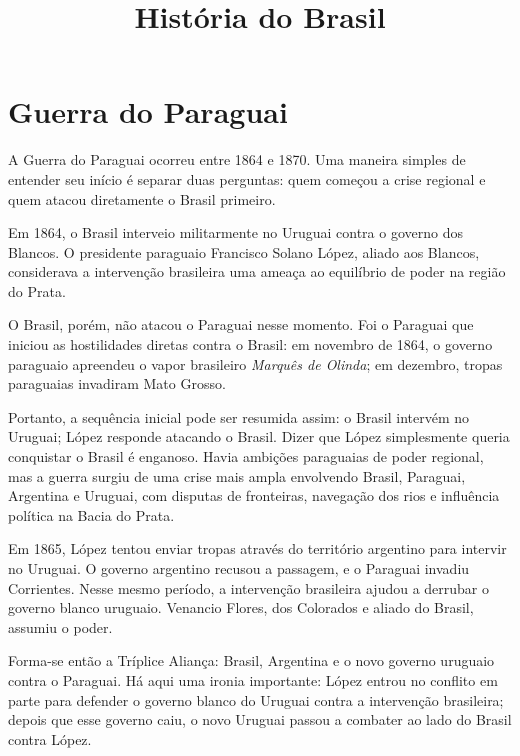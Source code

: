 



\title{História do Brasil}
\maketitle

\label{section-phantom}

\tableofcontents

\section{Guerra do Paraguai}
\label{section-guerra-do-paraguai}

A Guerra do Paraguai ocorreu entre 1864 e
1870. Uma maneira simples de entender seu
início é separar duas perguntas: quem começou
a crise regional e quem atacou diretamente o
Brasil primeiro.

Em 1864, o Brasil interveio militarmente no
Uruguai contra o governo dos Blancos. O
presidente paraguaio Francisco Solano López,
aliado aos Blancos, considerava a intervenção
brasileira uma ameaça ao equilíbrio de poder
na região do Prata.

O Brasil, porém, não atacou o Paraguai nesse
momento. Foi o Paraguai que iniciou as
hostilidades diretas contra o Brasil: em
novembro de 1864, o governo paraguaio
apreendeu o vapor brasileiro \emph{Marquês de
Olinda}; em dezembro, tropas paraguaias
invadiram Mato Grosso.

Portanto, a sequência inicial pode ser
resumida assim: o Brasil intervém no Uruguai;
López responde atacando o Brasil. Dizer que
López simplesmente queria conquistar o Brasil
é enganoso. Havia ambições paraguaias de
poder regional, mas a guerra surgiu de uma
crise mais ampla envolvendo Brasil, Paraguai,
Argentina e Uruguai, com disputas de
fronteiras, navegação dos rios e influência
política na Bacia do Prata.

Em 1865, López tentou enviar tropas através
do território argentino para intervir no
Uruguai. O governo argentino recusou a
passagem, e o Paraguai invadiu Corrientes.
Nesse mesmo período, a intervenção brasileira
ajudou a derrubar o governo blanco uruguaio.
Venancio Flores, dos Colorados e aliado do
Brasil, assumiu o poder.

Forma-se então a Tríplice Aliança: Brasil,
Argentina e o novo governo uruguaio contra o
Paraguai. Há aqui uma ironia importante: López
entrou no conflito em parte para defender o
governo blanco do Uruguai contra a intervenção
brasileira; depois que esse governo caiu, o
novo Uruguai passou a combater ao lado do
Brasil contra López.

